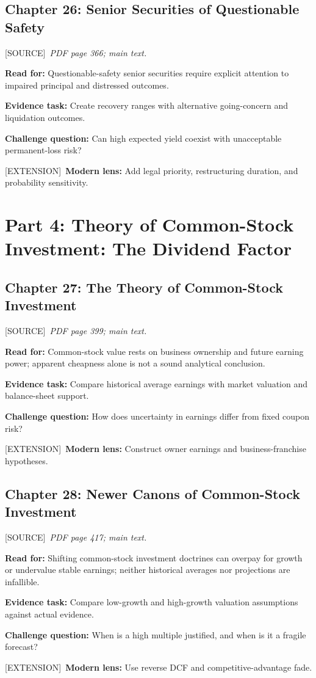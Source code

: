 \documentclass[11pt,letterpaper]{article}
\newcommand{\src}{\textsf{\color{sea}[SOURCE]}}
\newcommand{\ext}{\textsf{\color{gold}[EXTENSION]}}
\begin{document}
\subsection{Chapter 26: Senior Securities of Questionable Safety}
\src\ \textit{PDF page 366; main text.}\par
\textbf{Read for:} Questionable-safety senior securities require explicit attention to impaired principal and distressed outcomes.\par
\textbf{Evidence task:} Create recovery ranges with alternative going-concern and liquidation outcomes.\par
\textbf{Challenge question:} Can high expected yield coexist with unacceptable permanent-loss risk?\par
\ext\ \textbf{Modern lens:} Add legal priority, restructuring duration, and probability sensitivity.\par

\section{Part 4: Theory of Common-Stock Investment: The Dividend Factor}

\subsection{Chapter 27: The Theory of Common-Stock Investment}
\src\ \textit{PDF page 399; main text.}\par
\textbf{Read for:} Common-stock value rests on business ownership and future earning power; apparent cheapness alone is not a sound analytical conclusion.\par
\textbf{Evidence task:} Compare historical average earnings with market valuation and balance-sheet support.\par
\textbf{Challenge question:} How does uncertainty in earnings differ from fixed coupon risk?\par
\ext\ \textbf{Modern lens:} Construct owner earnings and business-franchise hypotheses.\par

\subsection{Chapter 28: Newer Canons of Common-Stock Investment}
\src\ \textit{PDF page 417; main text.}\par
\textbf{Read for:} Shifting common-stock investment doctrines can overpay for growth or undervalue stable earnings; neither historical averages nor projections are infallible.\par
\textbf{Evidence task:} Compare low-growth and high-growth valuation assumptions against actual evidence.\par
\textbf{Challenge question:} When is a high multiple justified, and when is it a fragile forecast?\par
\ext\ \textbf{Modern lens:} Use reverse DCF and competitive-advantage fade.\par
\end{document}
